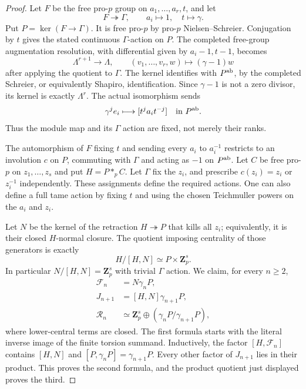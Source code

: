 \documentclass[11pt]{article}
\theoremstyle{definition}\newtheorem{definition}[theorem]{Definition}
\begin{document}
\begin{proof}
Let $F$ be the free pro-$p$ group on
$a_1,\ldots,a_r,t$, and let
\[
 F\twoheadrightarrow\Gamma,\qquad a_i\longmapsto1,
                         \quad t\longmapsto\gamma.
\]
Put $P=\ker(F\to\Gamma)$. It is free pro-$p$ by
pro-$p$ Nielsen--Schreier. Conjugation by $t$ gives
the stated continuous $\Gamma$-action on $P$.
The completed free-group augmentation resolution,
with differential given by $a_i-1,t-1$, becomes
\[
 \Lambda^{r+1}\longrightarrow\Lambda,\qquad
 (v_1,\ldots,v_r,w)\longmapsto(\gamma-1)w
\]
after applying the quotient to $\Gamma$.
The kernel identifies with $P^{\rm ab}$, by the completed
Schreier, or equivalently Shapiro, identification.
Since $\gamma-1$ is not a zero divisor, its kernel
is exactly $\Lambda^r$. The actual isomorphism sends
\[
       \gamma^j e_i\longmapsto[t^j a_i t^{-j}]
                                  \quad\text{in }P^{\rm ab}.
\]
Thus the module map and its $\Gamma$ action are fixed,
not merely their ranks.

The automorphism of $F$ fixing $t$ and sending every
$a_i$ to $a_i^{-1}$ restricts to an involution $c$
on $P$, commuting with $\Gamma$ and acting as $-1$
on $P^{\rm ab}$. Let $C$ be free pro-$p$ on
$z_1,\ldots,z_s$ and put $H=P\mathbin{*}_{p}C$.
Let $\Gamma$ fix the $z_i$, and prescribe
$c(z_i)=z_i$ or $z_i^{-1}$ independently.
These assignments define the required actions.
One can also define a full tame action by fixing $t$
and using the chosen Teichmuller powers on the $a_i$
and $z_i$.

Let $N$ be the kernel of the retraction
$H\twoheadrightarrow P$ that kills all $z_i$;
equivalently, it is their closed $H$-normal closure.
The quotient imposing centrality of those generators
is exactly
\[
                     H/[H,N]\simeq P\times\mathbf Z_p^s.
\]
In particular $N/[H,N]=\mathbf Z_p^s$ with trivial
$\Gamma$ action. We claim, for every $n\geq2$,
\begin{align*}
 \mathcal F_n&=N\gamma_nP,\\
 J_{n+1}&=[H,N]\gamma_{n+1}P,\\
 \mathcal R_n&\simeq\mathbf Z_p^s\oplus
                              (\gamma_nP/\gamma_{n+1}P),
\end{align*}
where lower-central terms are closed. The first
formula starts with the literal inverse image of
the finite torsion summand. Inductively, the factor
$[H,\mathcal F_n]$ contains $[H,N]$ and
$[P,\gamma_nP]=\gamma_{n+1}P$. Every other factor
of $J_{n+1}$ lies in their product. This proves the
second formula, and the product quotient just
displayed proves the third.


\end{proof}
\end{document}

